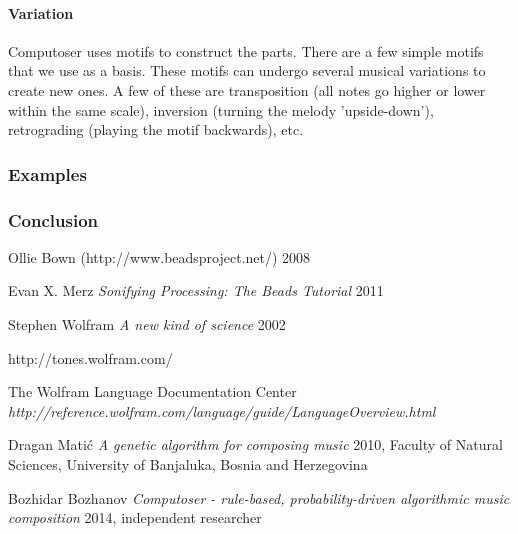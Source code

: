 \documentclass[12pt]{article}
\begin{document}
\paragraph{Variation} Computoser uses motifs to construct the parts. There are a few simple motifs that we use as a basis. These motifs can undergo several musical variations to create new ones. A few of these are transposition (all notes go higher or lower within the same scale), inversion (turning the melody 'upside-down'), retrograding (playing the motif backwards), etc.

\subsubsection{Examples}

\subsubsection{Conclusion}

\begin{thebibliography}{1}

 Ollie Bown (http://www.beadsproject.net/) 2008

 Evan X. Merz {\em Sonifying Processing: The Beads Tutorial} 2011

 Stephen Wolfram {\em A new kind of science} 2002

 http://tones.wolfram.com/

 The Wolfram Language Documentation Center {\em http://reference.wolfram.com/language/guide/LanguageOverview.html}

 Dragan Mati\'c {\em A genetic algorithm for composing music} 2010, Faculty of Natural Sciences, University of Banjaluka, Bosnia and Herzegovina

 Bozhidar Bozhanov {\em Computoser - rule-based, probability-driven algorithmic music composition} 2014,  independent researcher

\end{thebibliography}
\end{document}
